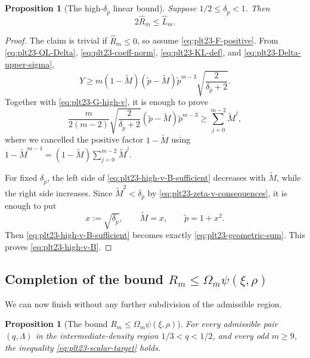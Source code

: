 ﻿\documentclass[11pt]{article}
\newtheorem{proposition}[theorem]{Proposition}
\numberwithin{equation}{section}
\begin{document}
\begin{proposition}[The high-$\delta_{\tilde p}$ linear bound]\label{prop:plt23-high-v-B}
  Suppose $1/2\le\delta_{\tilde p}<1$.
  Then
  \begin{equation}\label{eq:plt23-high-v-B}
    2\widehat R_m\le\widehat L_m.
  \end{equation}
\end{proposition}

\begin{proof}
  The claim is trivial if $\widehat R_m\le0$, so assume \eqref{eq:plt23-F-positive}.
  From \eqref{eq:plt23-QL-Delta}, \eqref{eq:plt23-coeff-norm}, \eqref{eq:plt23-KL-def}, and \eqref{eq:plt23-Delta-upper-sigma},
  \[
    Y\ge
    m(1-\tilde M)(\tilde p-\tilde M)\tilde p^{m-3}
    \sqrt{\frac2{\delta_{\tilde p}+2}}.
  \]
  Together with \eqref{eq:plt23-G-high-v}, it is enough to prove
  \begin{equation}\label{eq:plt23-high-v-B-sufficient}
    \frac{m}{2(m-2)}
    \sqrt{\frac2{\delta_{\tilde p}+2}}
    (\tilde p-\tilde M)\tilde p^{m-3}
    \ge
    \sum_{j=0}^{m-2}\tilde M^j,
  \end{equation}
  where we cancelled the positive factor $1-\tilde M$ using $1-\tilde M^{m-1}=(1-\tilde M)\sum_{j=0}^{m-2}\tilde M^j$.

  For fixed $\delta_{\tilde p}$, the left side of \eqref{eq:plt23-high-v-B-sufficient} decreases with $\tilde M$, while the right side increases.
  Since $\tilde M^2<\delta_{\tilde p}$ by \eqref{eq:plt23-zeta-v-consequences}, it is enough to put
  \[
    x:=\sqrt{\delta_{\tilde p}},
    \qquad
    \tilde M=x,
    \qquad
    \tilde p=1+x^2.
  \]
  Then \eqref{eq:plt23-high-v-B-sufficient} becomes exactly \eqref{eq:plt23-geometric-sum}.
  This proves \eqref{eq:plt23-high-v-B}.
\end{proof}

\subsection{Completion of the bound \texorpdfstring{$R_m\le\Omega_m\psi(\xi,\rho)$}{Rm <= Omega\_m psi}}

We can now finish without any further subdivision of the admissible region.

\begin{proposition}[The bound $R_m\le\Omega_m\psi(\xi,\rho)$]\label{prop:plt23-scalar}
  For every admissible pair $(q,\Lambda)$ in the intermediate-density region $1/3<q<1/2$, and every odd $m\ge9$, the inequality \eqref{eq:plt23-scalar-target} holds.
\end{proposition}
\end{document}
